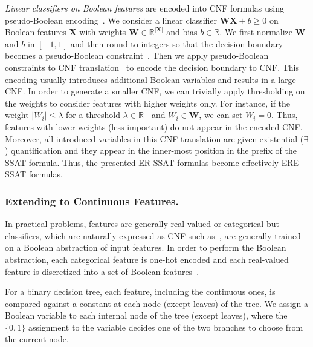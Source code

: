 \textit{Linear classifiers on Boolean features} are encoded into CNF formulas using pseudo-Boolean encoding~\cite{philipp2015pblib}. We consider a linear classifier  $ \mathbf{W} \mathbf{X} + b \ge 0 $ on Boolean features $ \mathbf{X} $ with weights $ \mathbf{W} \in \mathbb{R}^{|\mathbf{X}|} $ and bias $ b \in \mathbb{R} $.  We first normalize $ \mathbf{W} $ and $ b $ in $ [-1,1] $ and then round to integers so that the decision boundary becomes a pseudo-Boolean constraint~\cite{roussel2009pseudo}.  Then we apply  pseudo-Boolean constraints to CNF translation~\cite{philipp2015pblib} to encode the decision boundary to CNF. This encoding usually introduces additional Boolean variables and results in a large CNF. In order to generate a smaller CNF, we can trivially apply thresholding  on the weights to consider features with higher weights only. For instance, if the weight $  |W_i| \le \lambda $ for a threshold $ \lambda  \in \mathbb{R}^+$ and $ W_i \in \mathbf{W} $, we can set $ W_i = 0 $. Thus, features with lower weights (less important) do not appear in the encoded CNF.  Moreover, all introduced variables in this CNF translation are given existential ($ \exists $) quantification and they appear in the inner-most position in the prefix of the SSAT formula. Thus, the presented ER-SSAT formulas become effectively ERE-SSAT formulas.

\subsubsection{Extending to Continuous Features.}
In practical problems, features are generally real-valued or categorical but classifiers, which are naturally expressed as CNF such as~\cite{GMM20}, are generally trained on a Boolean abstraction of input features. In order to perform the Boolean abstraction, each categorical feature is one-hot encoded and each real-valued feature is discretized into a set of Boolean features~\cite{LKCL2019,GMM20}. 

For a binary decision tree, each feature, including the continuous ones, is compared against a constant at each node (except leaves) of the tree. We assign a Boolean variable to each internal node of the tree (except leaves), where the $ \{0,1\} $ assignment to the variable decides one of the two branches to choose from the current node.  

